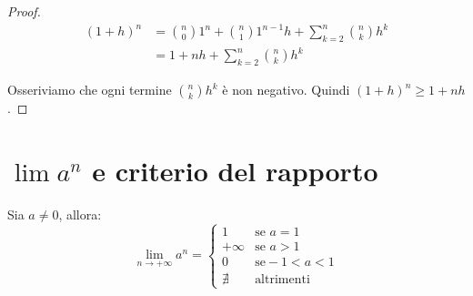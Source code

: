 \begin{proof}
\begin{align*}
(1+h)^n &= \binom{n}{0}1^n + \binom{n}{1}1^{n-1}h + \sum_{k=2}^n \binom{n}{k}h^k \\
&=  1 + nh + \sum_{k=2}^n \binom{n}{k}h^k
\end{align*}

Osseriviamo che ogni termine $\binom{n}{k}h^k$ è non negativo. Quindi $(1+h)^n \ge 1 + nh$.
\end{proof}

\section{$\lim a^n$ e criterio del rapporto}

\begin{theorem}
Sia $a \neq 0$, allora:
\begin{equation*}
\lim_{n \to +\infty} a^n = 
\begin{cases}
1 &\mbox{se } a = 1 \\
+\infty &\mbox{se } a > 1 \\
0 &\mbox{se} -1 < a < 1 \\
\nexists &\mbox{altrimenti}
\end{cases}
\end{equation*}
\end{theorem}

